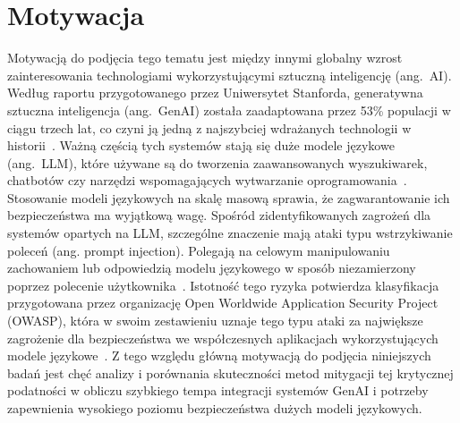 \section{Motywacja}
Motywacją do podjęcia tego tematu jest między innymi globalny wzrost zainteresowania technologiami wykorzystującymi sztuczną inteligencję (ang.~\gls{AI}).
Według raportu przygotowanego przez Uniwersytet Stanforda, generatywna sztuczna inteligencja (ang.~\gls{GenAI}) została zaadaptowana przez 53\% populacji w ciągu trzech lat, co czyni ją jedną z najszybciej wdrażanych technologii w historii~\cite{ai_index_2026}.
Ważną częścią tych systemów stają się duże modele językowe (ang.~\gls{LLM}), które używane są do tworzenia zaawansowanych wyszukiwarek, chatbotów czy narzędzi wspomagających wytwarzanie oprogramowania~\cite{nist_taxonomy_2025}.
Stosowanie modeli językowych na skalę masową sprawia, że zagwarantowanie ich bezpieczeństwa ma wyjątkową wagę.
Spośród zidentyfikowanych zagrożeń dla systemów opartych na LLM, szczególne znaczenie mają ataki typu wstrzykiwanie poleceń (ang. prompt injection). Polegają na celowym manipulowaniu zachowaniem lub odpowiedzią modelu językowego w sposób niezamierzony poprzez polecenie użytkownika~\cite{owasp_llm_top10}.
Istotność tego ryzyka potwierdza klasyfikacja przygotowana przez organizację Open Worldwide Application Security Project (OWASP), która w swoim zestawieniu uznaje tego typu ataki za największe zagrożenie dla bezpieczeństwa we współczesnych aplikacjach wykorzystujących modele językowe~\cite{owasp_llm_top10}.
Z tego względu główną motywacją do podjęcia niniejszych badań jest chęć analizy i porównania skuteczności metod mitygacji tej krytycznej podatności w obliczu szybkiego tempa integracji systemów GenAI i potrzeby zapewnienia wysokiego poziomu bezpieczeństwa dużych modeli językowych.